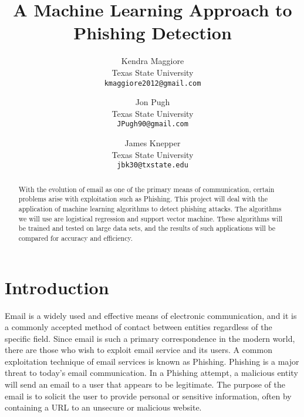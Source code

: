 \documentclass[10pt,twocolumn,letterpaper]{article}
\begin{document}
\title{A Machine Learning Approach to Phishing Detection}

\author{Kendra Maggiore\\
Texas State University\\
{\tt\small kmaggiore2012@gmail.com}
\and
Jon Pugh\\
Texas State University\\
{\tt\small JPugh90@gmail.com}
\and
James Knepper\\
Texas State University\\
{\tt\small jbk30@txstate.edu}
}

\maketitle

\begin{abstract}
   With the evolution of email as one of the primary means of communication, certain problems arise with exploitation such as Phishing.  This project will deal with the application of machine learning algorithms to detect phishing attacks.  The algorithms we will use are logistical regression and support vector machine.  These algorithms will be trained and tested on large data sets, and the results of such applications will be compared for accuracy and efficiency.  
\end{abstract}

\section{Introduction}

Email is a widely used and effective means of electronic communication, and it is a commonly accepted method of contact between entities regardless of the specific field.  Since email is such a primary correspondence in the modern world, there are those who wish to exploit email service and its users.  A common exploitation technique of email services is known as Phishing.  Phishing is a major threat to today’s email communication.  In a Phishing attempt, a malicious entity will send an email to a user that appears to be legitimate.  The purpose of the email is to solicit the user to provide personal or sensitive information, often by containing a URL to an unsecure or malicious website.
\end{document}
